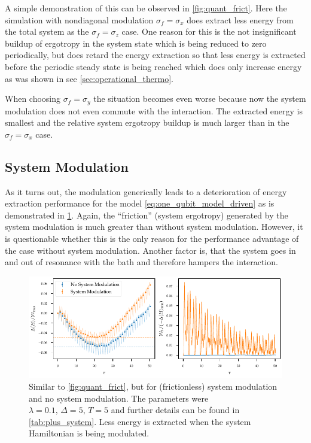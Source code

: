 A simple demonstration of this can be observed in
\cref{fig:quant_frict}. Here the simulation with nondiagonal
modulation \(σ_{f}=σ_{x}\) does extract less energy from the total
system as the \(σ_{f}=σ_{z}\) case. One reason for this is the not
insignificant buildup of ergotropy in the system state which is being
reduced to zero periodically, but does retard the energy extraction so
that less energy is extracted before the periodic steady state is
being reached which does only increase energy as was shown in see
\cref{sec:operational_thermo}.

When choosing \(σ_{f}=σ_{y}\) the situation becomes even worse because
now the system modulation does not even commute with the
interaction. The extracted energy is smallest and the relative system
ergotropy buildup is much larger than in the \(σ_{f}=σ_{x}\) case.

\subsection{System Modulation}
\label{sec:sys_mod_v_no_sys_mod}
As it turns out, the modulation generically leads to a deterioration
of energy extraction performance for the model
\cref{eq:one_qubit_model_driven} as is demonstrated in
\cref{fig:quant_frict_sys_no_sys}. Again, the ``friction'' (system
ergotropy) generated by the system modulation is much greater than
without system modulation. However, it is questionable whether this is
the only reason for the performance advantage of the case without
system modulation. Another factor is, that the system goes in and out
of resonance with the bath and therefore hampers the interaction.
\begin{figure}[htp]
  \centering
  \includegraphics{figs/one_bath_mod/system_vs_no_system}
  \caption{\label{fig:quant_frict_sys_no_sys} Similar to
    \cref{fig:quant_frict}, but for (frictionless) system modulation
    and no system modulation. The parameters were
    \(λ=0.1,\, Δ=5,\, T=5\) and further details can be found in
    \cref{tab:plus_system}. Less energy is extracted when the system
    Hamiltonian is being modulated.}
\end{figure}


